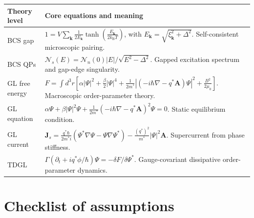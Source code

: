 \documentclass[11pt]{article}
\numberwithin{equation}{section}
\newcommand{\kB}{k_{\mathrm{B}}}
\newcommand{\kvec}{\bm{k}}
\newcommand{\DOS}{\mathcal{N}}
\begin{document}
\begin{center}
\renewcommand{\arraystretch}{1.25}
\begin{tabularx}{0.98\textwidth}{p{} X}
\toprule
\textbf{Theory level} & \textbf{Core equations and meaning}\\
\midrule
BCS gap & $\displaystyle 1=V\sum_{\kvec} \frac{1}{2E_{\kvec}}\tanh\left(\frac{E_{\kvec}}{2\kB T}\right)$, with $E_{\kvec}=\sqrt{\xi_{\kvec}^2+\Delta^2}$. Self-consistent microscopic pairing.\\
BCS QPs & $\displaystyle \DOS_s(E)=\DOS_n(0)|E|/\sqrt{E^2-\Delta^2}$. Gapped excitation spectrum and gap-edge singularity.\\
GL free energy & $\displaystyle F=\int d^3r\left[\alpha|\Psi|^2+\frac{\beta}{2}|\Psi|^4+\frac{1}{2m^*}|(-i\hbar\nabla-q^*\mathbf A)\Psi|^2+\frac{B^2}{2\mu_0}\right]$. Macroscopic order-parameter theory.\\
GL equation & $\displaystyle \alpha\Psi+\beta|\Psi|^2\Psi+\frac{1}{2m^*}(-i\hbar\nabla-q^*\mathbf A)^2\Psi=0$. Static equilibrium condition.\\
GL current & $\displaystyle \mathbf J_s=\frac{q^*\hbar}{2m^*i}(\Psi^*\nabla\Psi-\Psi\nabla\Psi^*)-\frac{(q^*)^2}{m^*}|\Psi|^2\mathbf A$. Supercurrent from phase stiffness.\\
TDGL & $\displaystyle \Gamma(\partial_t+iq^*\phi/\hbar)\Psi=-\delta F/\delta\Psi^*$. Gauge-covariant dissipative order-parameter dynamics.\\
\bottomrule
\end{tabularx}
\end{center}

\section{Checklist of assumptions}
\end{document}

